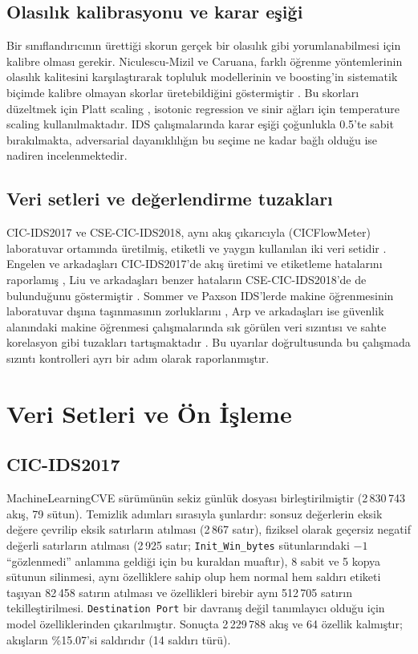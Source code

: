 \documentclass[conference]{IEEEtran}
\begin{document}
\subsection{Olasılık kalibrasyonu ve karar eşiği}
Bir sınıflandırıcının ürettiği skorun gerçek bir olasılık gibi yorumlanabilmesi için kalibre olması gerekir. Niculescu-Mizil ve Caruana, farklı öğrenme yöntemlerinin olasılık kalitesini karşılaştırarak topluluk modellerinin ve boosting'in sistematik biçimde kalibre olmayan skorlar üretebildiğini göstermiştir \cite{niculescu2005}. Bu skorları düzeltmek için Platt scaling \cite{platt1999}, isotonic regression \cite{zadrozny2002} ve sinir ağları için temperature scaling \cite{guo2017} kullanılmaktadır. IDS çalışmalarında karar eşiği çoğunlukla 0.5'te sabit bırakılmakta, adversarial dayanıklılığın bu seçime ne kadar bağlı olduğu ise nadiren incelenmektedir.

\subsection{Veri setleri ve değerlendirme tuzakları}
CIC-IDS2017 ve CSE-CIC-IDS2018, aynı akış çıkarıcıyla (CICFlowMeter) laboratuvar ortamında üretilmiş, etiketli ve yaygın kullanılan iki veri setidir \cite{sharafaldin2018}. Engelen ve arkadaşları CIC-IDS2017'de akış üretimi ve etiketleme hatalarını raporlamış \cite{engelen2021}, Liu ve arkadaşları benzer hataların CSE-CIC-IDS2018'de de bulunduğunu göstermiştir \cite{liu2022}. Sommer ve Paxson IDS'lerde makine öğrenmesinin laboratuvar dışına taşınmasının zorluklarını \cite{sommer2010}, Arp ve arkadaşları ise güvenlik alanındaki makine öğrenmesi çalışmalarında sık görülen veri sızıntısı ve sahte korelasyon gibi tuzakları tartışmaktadır \cite{arp2022}. Bu uyarılar doğrultusunda bu çalışmada sızıntı kontrolleri ayrı bir adım olarak raporlanmıştır.

\section{Veri Setleri ve Ön İşleme}

\subsection{CIC-IDS2017}
MachineLearningCVE sürümünün sekiz günlük dosyası birleştirilmiştir (2\,830\,743 akış, 79 sütun). Temizlik adımları sırasıyla şunlardır: sonsuz değerlerin eksik değere çevrilip eksik satırların atılması (2\,867 satır), fiziksel olarak geçersiz negatif değerli satırların atılması (2\,925 satır; \texttt{Init\_Win\_bytes} sütunlarındaki $-1$ ``gözlenmedi'' anlamına geldiği için bu kuraldan muaftır), 8 sabit ve 5 kopya sütunun silinmesi, aynı özelliklere sahip olup hem normal hem saldırı etiketi taşıyan 82\,458 satırın atılması ve özellikleri birebir aynı 512\,705 satırın tekilleştirilmesi. \texttt{Destination Port} bir davranış değil tanımlayıcı olduğu için model özelliklerinden çıkarılmıştır. Sonuçta 2\,229\,788 akış ve 64 özellik kalmıştır; akışların \%15.07'si saldırıdır (14 saldırı türü).
\end{document}
